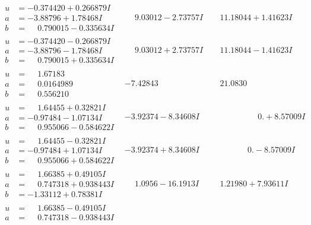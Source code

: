 \documentclass[1p]{elsarticle_modified}
\theoremstyle{definition}
\begin{document}
$$\begin{array}{c|c|c}
\begin{aligned}
u &= -0.374420 + 0.266879 I \\
a &= -3.88796 + 1.78468 I \\
b &= \phantom{-}0.790015 - 0.335634 I\end{aligned}
 & \phantom{-}9.03012 - 2.73757 I & \phantom{-}11.18044 + 1.41623 I \\ \hline\begin{aligned}
u &= -0.374420 - 0.266879 I \\
a &= -3.88796 - 1.78468 I \\
b &= \phantom{-}0.790015 + 0.335634 I\end{aligned}
 & \phantom{-}9.03012 + 2.73757 I & \phantom{-}11.18044 - 1.41623 I \\ \hline\begin{aligned}
u &= \phantom{-}1.67183\phantom{ +0.000000I} \\
a &= \phantom{-}0.0164989\phantom{ +0.000000I} \\
b &= \phantom{-}0.556210\phantom{ +0.000000I}\end{aligned}
 & -7.42843\phantom{ +0.000000I} & \phantom{-}21.0830\phantom{ +0.000000I} \\ \hline\begin{aligned}
u &= \phantom{-}1.64455 + 0.32821 I \\
a &= -0.97484 - 1.07134 I \\
b &= \phantom{-}0.955066 - 0.584622 I\end{aligned}
 & -3.92374 - 8.34608 I & \phantom{-0.000000 -}0. + 8.57009 I \\ \hline\begin{aligned}
u &= \phantom{-}1.64455 - 0.32821 I \\
a &= -0.97484 + 1.07134 I \\
b &= \phantom{-}0.955066 + 0.584622 I\end{aligned}
 & -3.92374 + 8.34608 I & \phantom{-0.000000 } 0. - 8.57009 I \\ \hline\begin{aligned}
u &= \phantom{-}1.66385 + 0.49105 I \\
a &= \phantom{-}0.747318 + 0.938443 I \\
b &= -1.33112 + 0.78381 I\end{aligned}
 & \phantom{-}1.0956 - 16.1913 I & \phantom{-}1.21980 + 7.93611 I \\ \hline\begin{aligned}
u &= \phantom{-}1.66385 - 0.49105 I \\
a &= \phantom{-}0.747318 - 0.938443 I \\

\end{aligned}
\end{array}$$
\end{document}
